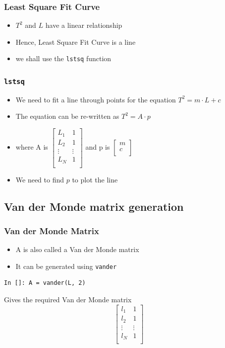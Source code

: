\documentclass[14pt,compress]{beamer}
\newcommand{\typ}[1]{\lstinline{#1}}
\begin{document}
\begin{frame}
\frametitle{Least Square Fit Curve}
\begin{itemize}
\item $T^2$ and $L$ have a linear relationship
\item Hence, Least Square Fit Curve is a line
\item we shall use the \typ{lstsq} function
\end{itemize}
\end{frame}

\begin{frame}[fragile]
\frametitle{\typ{lstsq}}
\begin{itemize}
\item We need to fit a line through points for the equation $T^2 = m \cdot L+c$
\item The equation can be re-written as $T^2 = A \cdot p$
\item where A is   
  $\begin{bmatrix}
  L_1 & 1 \\
  L_2 & 1 \\
  \vdots & \vdots\\
  L_N & 1 \\
  \end{bmatrix}$
  and p is 
  $\begin{bmatrix}
  m\\
  c\\
  \end{bmatrix}$
\item We need to find $p$ to plot the line
\end{itemize}
\end{frame}

\subsection{Van der Monde matrix generation}
\begin{frame}[fragile]
\frametitle{Van der Monde Matrix}
\begin{itemize}
\item A is also called a Van der Monde matrix
\item It can be generated using \typ{vander}
\end{itemize}
\begin{lstlisting}
In []: A = vander(L, 2)
\end{lstlisting}
Gives the required Van der Monde matrix
\begin{equation*}
  \begin{bmatrix}
    l_1 & 1 \\
    l_2 & 1 \\
    \vdots & \vdots\\
    l_N & 1 \\
  \end{bmatrix}
\end{equation*}

\end{frame}
\end{document}
